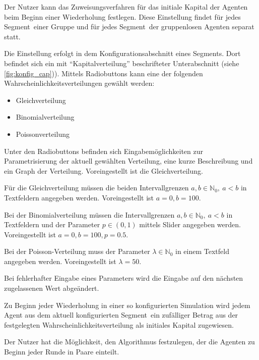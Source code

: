 \documentclass[parskip=full,11pt]{scrartcl}
\def\segment{Segment}
\begin{document}
Der \Gls{Nutzer} kann das Zuweisungsverfahren für das initiale \Gls{Kapital} der Agenten beim Beginn einer Wiederholung festlegen. Diese Einstellung findet für jedes \segment\ einer Gruppe und für jedes \segment\ der gruppenlosen Agenten separat statt.

Die Einstellung erfolgt in dem Konfigurationsabschnitt eines \segment s. Dort befindet sich ein mit \enquote{Kapitalverteilung} beschrifteter Unterabschnitt (siehe \cref{fig:konfig_cap})). Mittels Radiobuttons kann eine der folgenden Wahrscheinlichkeitsverteilungen gewählt werden:
\begin{itemize}\itemsep -10pt
\item Gleichverteilung
\item Binomialverteilung
\item Poissonverteilung
\end{itemize}
Unter den Radiobuttons befinden sich Eingabemöglichkeiten zur Parametrisierung der aktuell gewählten Verteilung, eine kurze Beschreibung und ein Graph der Verteilung. Voreingestellt ist die Gleichverteilung.

Für die Gleichverteilung müssen die beiden Intervallgrenzen \(a,b \in \mathbb{N}_0, \ a < b\) in Textfeldern angegeben werden. Voreingestellt ist \(a = 0, b = 100\).

Bei der Binomialverteilung müssen die Intervallgrenzen \(a,b \in \mathbb{N}_0, \ a < b\) in Textfeldern und der Parameter \(p \in (0,1)\) mittels Slider angegeben werden. Voreingestellt ist \(a = 0, b = 100, p = 0.5\).

Bei der Poisson-Verteilung muss der Parameter \(\lambda \in \mathbb{N}_0\) in einem Textfeld angegeben werden. Voreingestellt ist \(\lambda = 50\).

Bei fehlerhafter Eingabe eines Parameters wird die Eingabe auf den nächsten zugelassenen Wert abgeändert.

Zu Beginn jeder Wiederholung in einer so konfigurierten Simulation wird jedem Agent aus dem aktuell konfigurierten \segment\ ein zufälliger Betrag aus der festgelegten Wahrscheinlichkeitsverteilung als initiales \Gls{Kapital} zugewiesen.


Der \Gls{Nutzer} hat die Möglichkeit, den Algorithmus festzulegen, der die Agenten zu Beginn jeder Runde in Paare einteilt.
\end{document}
